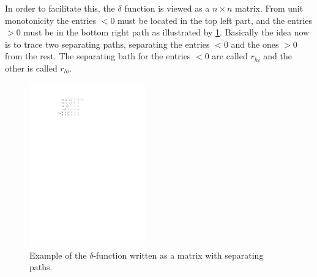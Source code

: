 \documentclass[twoside,11pt,openright]{report}
\begin{document}
In order to facilitate this, the $\delta$ function is viewed as a $n \times n$ matrix. From unit monotonicity the entries $< 0$ must be located in the top left part, and the entries $> 0$ must be in the bottom right path as illustrated by \cref{fig:delta-example}. Basically the idea now is to trace two separating paths, separating the entries $< 0$ and the ones $> 0$ from the rest. The separating bath for the entries $< 0$ are called $r_{hi}$ and the other is called $r_{lo}$.

\begin{figure}[!htb]
  \centering
  \includegraphics[width=5cm]{images/delta-matrix}
  \caption{Example of the $\delta$-function written as a matrix with separating paths.}
  \label{fig:delta-example}
\end{figure}
\end{document}
